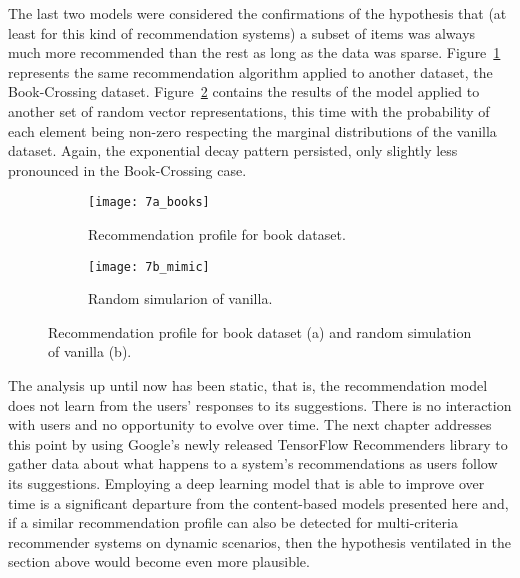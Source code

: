 The last two models were considered the confirmations of the hypothesis that (at
least for this kind of recommendation systems) a subset of items was always much
more recommended than the rest as long as the data was sparse.
Figure~\ref{fig:fig7a} represents the same recommendation algorithm applied to
another dataset, the Book-Crossing dataset. Figure~\ref{fig:fig7b} contains the
results of the model applied to another set of random vector representations,
this time with the probability of each element being non-zero respecting the
marginal distributions of the vanilla dataset. Again, the exponential decay
pattern persisted, only slightly less pronounced in the Book-Crossing case.

\begin{figure}
  \centering
  \begin{subfigure}{0.45\textwidth}
    \centering
    \texttt{[image: 7a\_books]}
    \caption{Recommendation profile for book dataset.\label{fig:fig7a}}
  \end{subfigure}
  \begin{subfigure}{0.45\textwidth}
    \centering
    \texttt{[image: 7b\_mimic]}
    \caption{Random simularion of vanilla.\label{fig:fig7b}}
  \end{subfigure}
  \caption{Recommendation profile for book dataset (a) and random simulation of
    vanilla (b).\label{fig:fig7}}
\end{figure}

The analysis up until now has been static, that is, the recommendation model
does not learn from the users' responses to its suggestions. There is no
interaction with users and no opportunity to evolve over time. The next chapter
addresses this point by using Google's newly released TensorFlow Recommenders
library \citep{noauthor_tensorflow_nodate} to gather data about what happens to
a system's recommendations as users follow its suggestions. Employing a deep
learning model that is able to improve over time is a significant departure from
the content-based models presented here and, if a similar recommendation profile
can also be detected for multi-criteria recommender systems on dynamic
scenarios, then the hypothesis ventilated in the section above would become even
more plausible.
